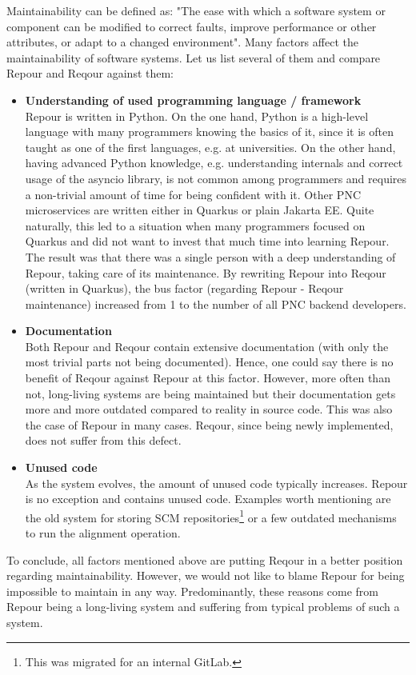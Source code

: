 \documentclass[../main.tex]{subfiles}
\begin{document}
Maintainability can be defined as: "The ease with which a software system or component can be modified to correct faults, improve performance
or other attributes, or adapt to a changed environment"\cite{software-glossary}. Many factors affect the maintainability of software systems. Let us list several of them and compare Repour and Reqour against them:
\begin{itemize}
    \item \textbf{Understanding of used programming language / framework}\\
    Repour is written in Python. On the one hand, Python is a high-level language with many programmers knowing the basics of it, since it is often taught as one of the first languages, e.g. at universities. On the other hand, having advanced Python knowledge, e.g. understanding internals and correct usage of the asyncio library, is not common among programmers and requires a non-trivial amount of time for being confident with it. Other PNC microservices are written either in Quarkus or plain Jakarta EE. Quite naturally, this led to a situation when many programmers focused on Quarkus and did not want to invest that much time into learning Repour. The result was that there was a single person with a deep understanding of Repour, taking care of its maintenance. By rewriting Repour into Reqour (written in Quarkus), the bus factor (regarding Repour - Reqour maintenance) increased from 1 to the number of all PNC backend developers.

    \item \textbf{Documentation}\\
    Both Repour and Reqour contain extensive documentation (with only the most trivial parts not being documented). Hence, one could say there is no benefit of Reqour against Repour at this factor. However, more often than not, long-living systems are being maintained but their documentation gets more and more outdated compared to reality in source code. This was also the case of Repour in many cases. Reqour, since being newly implemented, does not suffer from this defect.

    \item \textbf{Unused code}\\
    As the system evolves, the amount of unused code typically increases. Repour is no exception and contains unused code. Examples worth mentioning are the old system for storing SCM repositories\footnote{This was migrated for an internal GitLab.} or a few outdated mechanisms to run the alignment operation.
\end{itemize}

To conclude, all factors mentioned above are putting Reqour in a better position regarding maintainability. However, we would not like to blame Repour for being impossible to maintain in any way. Predominantly, these reasons come from Repour being a long-living system and suffering from typical problems of such a system.
\end{document}
